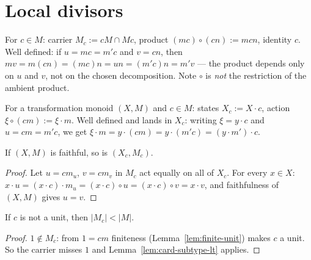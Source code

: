 \chapter{Local divisors}\label{ch:localdivisor}

\begin{definition}\label{def:localdiv}
  \leanok
  For $c \in M$: carrier $M_c := cM \cap Mc$, product
  $(mc) \circ (cn) := mcn$, identity $c$. Well defined: if
  $u = mc = m'c$ and $v = cn$, then
  $mv = m(cn) = (mc)n = un = (m'c)n = m'v$ --- the product depends only
  on $u$ and $v$, not on the chosen decomposition. Note $\circ$ is
  \emph{not} the restriction of the ambient product.
\end{definition}

\begin{definition}
  \label{def:localdiv-tm}
  \leanok
  For a transformation monoid $(X, M)$ and $c \in M$: states
  $X_c := X \cdot c$, action $\xi \circ (cm) := \xi \cdot m$. Well
  defined and lands in $X_c$: writing $\xi = y \cdot c$ and
  $u = cm = m'c$, we get
  $\xi \cdot m = y \cdot (cm) = y \cdot (m'c) = (y \cdot m') \cdot c$.
\end{definition}

\begin{lemma}[{[DKS] 2.13}: faithfulness]\label{lem:localdiv-faithful}
  \leanok
  If $(X, M)$ is faithful, so is $(X_c, M_c)$.
\end{lemma}
\begin{proof}
  \leanok
  Let $u = cm_u$, $v = cm_v$ in $M_c$ act equally on all of $X_c$. For
  every $x \in X$: $x \cdot u = (x \cdot c) \cdot m_u =
  (x \cdot c) \circ u = (x \cdot c) \circ v = x \cdot v$, and
  faithfulness of $(X, M)$ gives $u = v$.
\end{proof}

\begin{lemma}\label{lem:localdiv-card}
  \leanok
  If $c$ is not a unit, then $|M_c| < |M|$.
\end{lemma}
\begin{proof}
  \leanok
  $1 \notin M_c$: from $1 = cm$ finiteness (Lemma~\ref{lem:finite-unit})
  makes $c$ a unit. So the carrier misses $1$ and
  Lemma~\ref{lem:card-subtype-lt} applies.
\end{proof}


